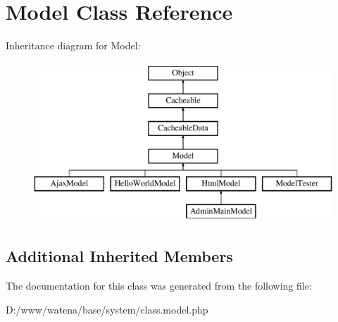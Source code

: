 \hypertarget{class_model}{\section{Model Class Reference}
\label{class_model}
}
Inheritance diagram for Model\-:\begin{figure}[H]
\begin{center}
\leavevmode
\includegraphics[height=6.000000cm]{class_model}
\end{center}
\end{figure}
\subsection*{Additional Inherited Members}


The documentation for this class was generated from the following file\-:\begin{DoxyCompactItemize}
\item 
D\-:/www/watena/base/system/class.\-model.\-php\end{DoxyCompactItemize}
